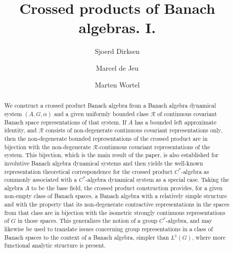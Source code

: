 \documentclass{amsart}
\theoremstyle{plain}
\theoremstyle{definition}
\numberwithin{equation}{section}
\begin{document}
\title{Crossed products of Banach algebras. I.}

\author{Sjoerd Dirksen}
\address{Sjoerd Dirksen, Delft Institute of Applied Mathematics, Delft University of Technology, P.O.\ Box 5031, 2600 GA Delft, The Netherlands}

\author{Marcel de Jeu}
\address{Marcel de Jeu, Mathematical Institute, Leiden University, P.O.\ Box 9512, 2300 RA Leiden, The Netherlands}

\author{Marten Wortel}
\address{Marten Wortel, Mathematical Institute, Leiden University, P.O.\ Box 9512, 2300 RA Leiden, The Netherlands}



\begin{abstract}
We construct a crossed product Banach algebra from a Banach algebra dynamical system ${(A,G,\alpha)}$ and a given uniformly bounded class ${\mathcal R}$ of continuous covariant Banach space representations of that system. If $A$ has a bounded left approximate identity, and ${\mathcal R}$ consists of non-degenerate continuous covariant representations only, then the non-degenerate bounded representations of the crossed product are in bijection with the non-degenerate ${\mathcal R}$-continuous covariant representations of the system. This bijection, which is the main result of the paper, is also established for involutive Banach algebra dynamical systems and then yields the well-known representation theoretical correspondence for the crossed product $C^*$-algebra as commonly associated with a $C^*$-algebra dynamical system as a special case. Taking the algebra $A$ to be the base field, the crossed product construction provides, for a given non-empty class of Banach spaces, a Banach algebra with a relatively simple structure and with the property that its non-degenerate contractive representations in the spaces from that class are in bijection with the isometric strongly continuous representations of $G$ in those spaces. This generalizes the notion of a group $C^*$-algebra, and may likewise be used to translate issues concerning group representations in a class of Banach spaces to the context of a Banach algebra, simpler than $L^1(G)$, where more functional analytic structure is present.
\end{abstract}
\end{document}

